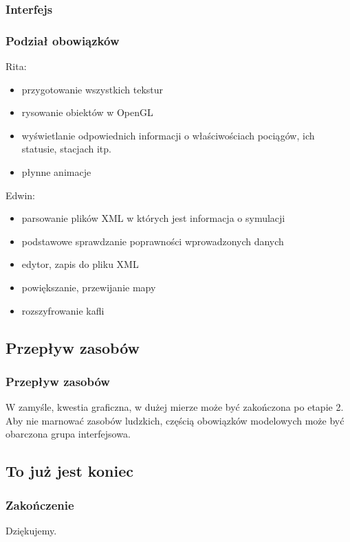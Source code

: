 \documentclass[a4paper, 11pt]{beamer}
\begin{document}
\begin{frame}
\frametitle{Interfejs}
\frametitle{Podział obowiązków}
Rita:
\begin{itemize}
\item przygotowanie wszystkich tekstur
\item rysowanie obiektów w OpenGL
\item wyświetlanie odpowiednich informacji o właściwościach pociągów, ich statusie, stacjach itp.
\item płynne animacje
\end{itemize}
Edwin:
\begin{itemize}
\item parsowanie plików XML w których jest informacja o symulacji
\item podstawowe sprawdzanie poprawności wprowadzonych danych
\item edytor, zapis do pliku XML
\item powiększanie, przewijanie mapy
\item rozszyfrowanie kafli
\end{itemize}
\end{frame}
\subsection{Przepływ zasobów}
\begin{frame}
\frametitle{Przepływ zasobów}
W zamyśle, kwestia graficzna, w dużej mierze może być zakończona po etapie 2. Aby nie marnować zasobów ludzkich, częścią obowiązków modelowych może być obarczona grupa interfejsowa.
\end{frame}
\subsection{To już jest koniec}
\begin{frame}
\frametitle{Zakończenie}
Dziękujemy.
\end{frame}
\end{document}

